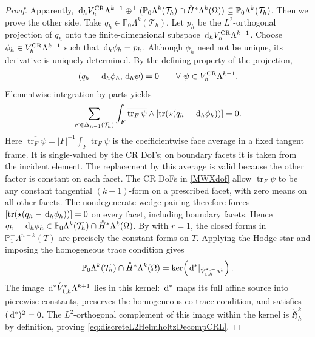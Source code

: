 \documentclass[10pt]{amsart}
\numberwithin{equation}{section}
\newcommand{\dd}{\,{\rm d}}
\newcommand{\tr}{\operatorname{tr}}
\begin{document}
\begin{proof}
	Apparently, $\dd_h V_h^{\rm CR}\Lambda^{k-1} \oplus^{\perp} (\mathbb P_0\Lambda^k(\mathcal T_h)\cap \mathring{H}^{*}\Lambda^k(\Omega))\subseteq \mathbb P_{0}\Lambda^k(\mathcal T_h)$.
	Then we prove the other side. Take $ q_h\in\mathbb P_{0}\Lambda^k(\mathcal T_h)$. 
Let $p_h$ be the $L^2$-orthogonal projection of $q_h$ onto the
finite-dimensional subspace $\dd_hV_h^{\rm CR}\Lambda^{k-1}$.
Choose $\phi_h\in V_h^{\rm CR}\Lambda^{k-1}$ such that
$\dd_h\phi_h=p_h$. Although $\phi_h$ need not be unique, its derivative
is uniquely determined. By the defining property of the projection,
	\begin{equation*}
		( q_h-\dd_h\phi_h, \dd_h\psi)=0\qquad\forall~\psi\in V_h^{\rm CR}\Lambda^{k-1}.
	\end{equation*}
	Elementwise integration by parts yields
	\begin{equation*}
\sum_{F\in \Delta_{n-1}(\mathcal T_h)}\int_F\overline{\tr_F\psi}\wedge[\tr(\star(q_h-\dd_h\phi_h))]=0.
	\end{equation*}
Here $\overline{\tr_F\psi}=|F|^{-1}\int_F\tr_F\psi$ is the coefficientwise
face average in a fixed tangent frame. It is single-valued by the CR DoFs;
on boundary facets it is taken from the incident element. The replacement
by this average is valid because the other factor is constant on each facet.
The CR DoFs in \eqref{MWXdof} allow
$\overline{\tr_F\psi}$ to be any constant tangential $(k-1)$-form
on a prescribed facet, with zero means on all other facets.
The nondegenerate wedge pairing therefore forces
$[\tr(\star(q_h-\dd_h\phi_h))]=0$ on every facet, including boundary facets.
Hence $q_h-\dd_h\phi_h\in
\mathbb P_0\Lambda^k(\mathcal T_h)\cap\mathring H^*\Lambda^k(\Omega)$.
By \cite[Theorem~5.4]{ArnoldFalkWinther2010} with $r=1$, the closed
forms in $\mathbb P_1^-\Lambda^{n-k}(T)$ are precisely the constant forms
on $T$. Applying the Hodge star and imposing the homogeneous trace
condition gives
\[
\mathbb P_0\Lambda^k(\mathcal T_h)\cap\mathring H^*\Lambda^k(\Omega)
=\ker\!\left(\dd^*|_{\mathring V_{1,h}^{*,-}\Lambda^k}\right).
\]
The image $\dd^*\mathring V_{1,h}^{*}\Lambda^{k+1}$ lies in this kernel:
$\dd^*$ maps its full affine source into piecewise constants, preserves
the homogeneous co-trace condition, and satisfies $(\dd^*)^2=0$.
The $L^2$-orthogonal complement of this image within the kernel is
$\mathring{\mathfrak H}_h^k$ by definition, proving
\eqref{eq:discreteL2HelmholtzDecompCRL}.
\end{proof}
\end{document}
